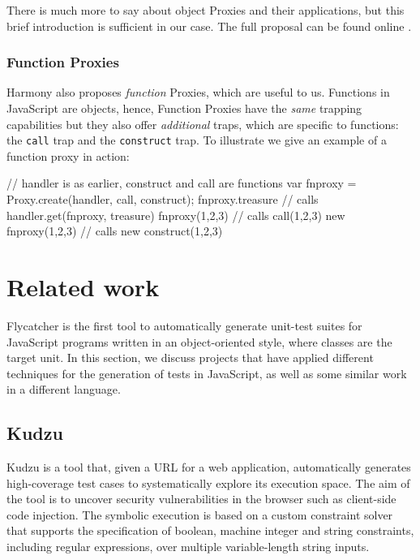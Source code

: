 There is much more to say about object Proxies and their applications, but this brief introduction is sufficient in our case. The full proposal can be found online \cite{harmony}.

\subsubsection{Function Proxies}

Harmony also proposes \emph{function} Proxies, which are useful to us. Functions in JavaScript are objects, hence, Function Proxies have the \emph{same} trapping capabilities but they also offer \emph{additional} traps, which are specific to functions: the \texttt{call} trap and the \texttt{construct} trap. To illustrate we give an example of a function proxy in action:

\begin{code}[caption=Function Proxy,label=fnproxy]
// handler is as earlier, construct and call are functions
var fnproxy = Proxy.create(handler, call, construct);
fnproxy.treasure   // calls handler.get(fnproxy, treasure)
fnproxy(1,2,3)     // calls call(1,2,3)
new fnproxy(1,2,3) // calls new construct(1,2,3)
\end{code}

\section{Related work}
\textsf{Flycatcher} is the first tool to automatically generate unit-test suites for JavaScript programs written in an object-oriented style, where classes are the target unit. In this section, we discuss projects that have applied different techniques for the generation of tests in JavaScript, as well as some similar work in a different language.

\subsection{Kudzu}
\textsf{Kudzu} \cite{saxena2010symbolic} is a tool that, given a URL for a web application, automatically generates high-coverage test cases to systematically explore its execution space. The aim of the tool is to uncover security vulnerabilities in the browser such as client-side code injection. The symbolic execution is based on a custom constraint solver that supports the specification of boolean, machine integer and string constraints, including regular expressions, over multiple variable-length string inputs.

